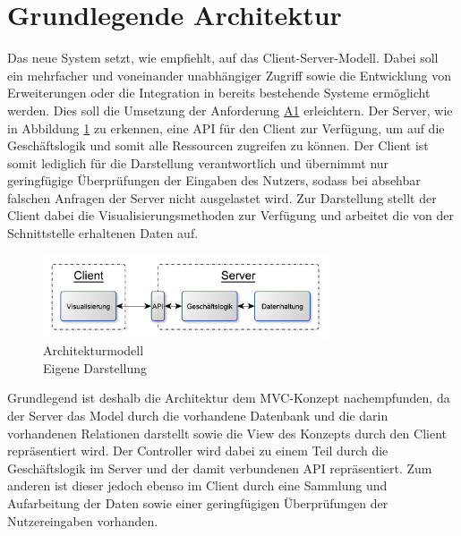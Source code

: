 \section{Grundlegende Architektur}
\label{sec:Architektur}

Das neue System setzt, wie \citeauthor{MS-Fielding.} empfiehlt, auf das Client-Server-Modell.
Dabei soll ein mehrfacher und voneinander unabhängiger Zugriff sowie die Entwicklung von Erweiterungen oder die Integration in bereits bestehende Systeme ermöglicht werden.
Dies soll die Umsetzung der Anforderung \hyperref[Anf:A1]{A1} erleichtern.
Der Server, wie in Abbildung \ref{img:einkaufBPMN} zu erkennen, eine \ac{API} für den Client zur Verfügung, um auf die Geschäftslogik und somit alle Ressourcen zugreifen zu können.
Der Client ist somit lediglich für die Darstellung verantwortlich und übernimmt nur geringfügige Überprüfungen der Eingaben des Nutzers, sodass bei absehbar falschen Anfragen der Server nicht ausgelastet wird.
Zur Darstellung stellt der Client dabei die Visualisierungsmethoden zur Verfügung und arbeitet die von der Schnittstelle erhaltenen Daten auf.

\begin{figure}[h]
  \centering
  \includegraphics[width=0.75\textwidth]{img/konzeption/gesamtkonzept/Architektur.pdf}
  \captionsetup{format=plain,justification=centering}
  \caption[Architekturmodell]{Architekturmodell \\ \quelle Eigene Darstellung}
  \label{img:einkaufBPMN}
\end{figure}

Grundlegend ist deshalb die Architektur dem \ac{MVC}-Konzept nachempfunden, da der Server das Model durch die vorhandene Datenbank und die darin vorhandenen Relationen darstellt sowie die View des Konzepts durch den Client repräsentiert wird.
Der Controller wird dabei zu einem Teil durch die Geschäftslogik im Server und der damit verbundenen \ac{API} repräsentiert.
Zum anderen ist dieser jedoch ebenso im Client durch eine Sammlung und Aufarbeitung der Daten sowie einer geringfügigen Überprüfungen der Nutzereingaben vorhanden.\autocite{rf-leff2001web}
